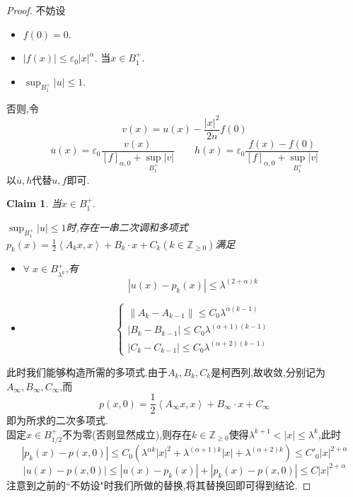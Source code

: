 \documentclass[12pt,A4paper,reqno]{amsart}
\numberwithin{equation}{section}
\theoremstyle{plain}
\newtheorem{claim}[theorem]{Claim}
\theoremstyle{plain}
\theoremstyle{plain}
\numberwithin{equation}{section}
\theoremstyle{remark}
\begin{document}
\begin{proof}
	不妨设
	\begin{itemize}
		\item $f(0)=0.$
		\item $|f(x)|\leqslant\varepsilon_{0}|x|^{\alpha}.$ 当$x \in B_1^{+}.$
		\item $\sup _{B_{1}^{+}} |u| \leqslant 1.$
	\end{itemize}
否则,令
$$
v(x)=u(x)-\frac{|x|^{2}}{2 n} f(0)
$$
$$
\overline{u}(x)=\varepsilon_{0} \frac{v(x)}{[f]_{\alpha, 0}+\sup _{B_{1}^{+}} |v|}
\qquad
h(x)=\varepsilon_{0} \frac{f(x)-f(0)}{[f]_{\alpha, 0}+\sup _{B_{1}^{+}} |v|}
$$
以$\overline{u},h$代替$u,f$即可.
\begin{claim}
	当$x \in B_1^{+}.$
	\item $\sup _{B_{1}^{+}} |u| \leqslant 1$时,存在一串二次调和多项式$
	p_{k}(x)=\frac{1}{2}\left\langle A_{k} x, x\right\rangle+ B_{k} \cdot x+C_{k}
	(k \in \mathbb{Z}_{\geqslant 0})$满足
	\begin{itemize}
		\item $\forall\; x \in B_{\lambda^k}^{+}$,有$$
		\left|u(x)-p_{k}(x)\right| \leqslant \lambda^{(2+\alpha) k}
		$$
		\item $$\begin{cases}
			\left\|A_{k}-A_{k-1}\right\| \leqslant C_0 \lambda^{\alpha(k-1)}\\
			\left|B_{k}-B_{k-1}\right| \leqslant C_0 \lambda^{(\alpha+1)(k-1)}\\
			\left|C_{k}-C_{k-1}\right| \leqslant C_0 \lambda^{(\alpha+2)(k-1)}
		\end{cases}$$
	\end{itemize}
\end{claim}
此时我们能够构造所需的多项式.由于${A_k},{B_k},{C_k}$是柯西列,故收敛,分别记为$A_{\infty},B_{\infty},C_{\infty}$,而
$$p(x, 0)=\frac{1}{2}\left\langle A_{\infty} x, x\right\rangle+ B_{\infty} \cdot x+C_{\infty}$$
即为所求的二次多项式.\\
固定$x \in B_{1/2}^{+}$不为零(否则显然成立),则存在$k \in \mathbb{Z}_{\geqslant 0}$使得$\lambda^{k+1}<|x| \leqslant \lambda^{k}$,此时
$$\left|p_{k}(x)-p(x, 0)\right| \leqslant C_0\left(\lambda^{\alpha k}|x|^{2}+\lambda^{(\alpha+1) k}|x|+\lambda^{(\alpha+2) k} \right)\leqslant C'_0|x|^{2+\alpha}$$
$$|u(x)-p(x, 0)| \leqslant\left|u(x)-p_{k}(x)\right|+\left|p_{k}(x)-p(x, 0)\right| \leqslant C|x|^{2+\alpha}$$
注意到之前的``不妨设"时我们所做的替换,将其替换回即可得到结论.
\end{proof}
\end{document}
